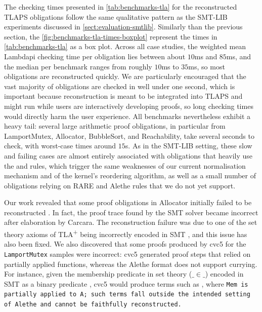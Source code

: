 The checking times presented in \cref{tab:benchmarks-tla} for the reconstructed TLAPS obligations follow the same qualitative pattern as the SMT-LIB experiments discussed in \cref{sect:evaluation-smtlib}.
Similarly than the previous section, the \cref{fig:benchmarks-tla-times-boxplot} represent the times in \cref{tab:benchmarks-tla} as a box plot.
Across all case studies, the weighted mean Lambdapi checking time per obligation lies between about $10$ms and $85$ms, and the median per benchmark ranges from roughly $10$ms to $35$ms, so most obligations are reconstructed quickly.
We are particularly encouraged that the vast majority of obligations are checked in well under one second, which is important because reconstruction is meant to be integrated into TLAPS and might run while users are interactively developing proofs, so long checking times would directly harm the user experience.
All benchmarks nevertheless exhibit a heavy tail: several large arithmetic proof obligations, in particular from LamportMutex, Allocator, BubbleSort, and Reachability, take several seconds to check, with worst-case times around $15$s.
As in the SMT-LIB setting, these slow and failing cases are almost entirely associated with obligations that heavily use the  and  rules, which trigger the same weaknesses of our current normalisation mechanism and of the kernel's reordering algorithm, as well as a small number of obligations relying on RARE and Alethe rules that we do not yet support.

Our work revealed that some proof obligations in Allocator initially failed to be reconstructed \cite{ColtellacciMD24}. In fact, the proof trace found by the SMT solver became incorrect after elaboration by Carcara.
The reconstruction failure was due to one of the set theory axioms of TLA\textsuperscript{+} being incorrectly encoded in SMT \cite{new-encoding-tlaps}, and this issue has also been fixed.
We also discovered that some proofs produced by cvc5 for the \texttt{LamportMutex} samples were incorrect: cvc5 generated proof steps that relied on partially applied functions, whereas the Alethe format does not support currying.
For instance, given the membership predicate in set theory ($\_ \in \_$) encoded in SMT as a binary predicate , cvc5 would produce terms such as , where \tt{Mem} is partially applied to \tt{A};
such terms fall outside the intended setting of Alethe and cannot be faithfully reconstructed.

